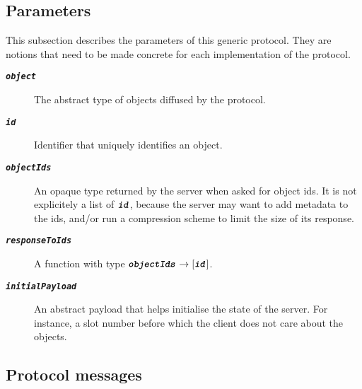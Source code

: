 \subsection{Parameters}

This subsection describes the parameters of this generic protocol.
They are notions that need to be made concrete for each implementation of the protocol.

\newcommand\argfont[1]{\textbf{\texttt{\textit{#1}}}}

\begin{description}
\item [\argfont{object}] The abstract type of objects diffused by the protocol.
\item [\argfont{id}] Identifier that uniquely identifies an object.
\item [\argfont{objectIds}] An opaque type returned by the server when asked for object ids.
  It is not explicitely a list of $\argfont{id}$, because the server may want to add metadata to the ids, and/or run a compression scheme to limit the size of its response.
\item [\argfont{responseToIds}] A function with type $\argfont{objectIds} \rightarrow [\argfont{id}]$.
\item [\argfont{initialPayload}] An abstract payload that helps initialise the state of the server.
  For instance, a slot number before which the client does not care about the objects.
\end{description}

\subsection{Protocol messages}

